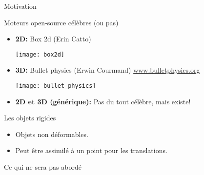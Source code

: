 \begin{frame}{Motivation}
    \begin{figure}[h]
        \setcounter{subfigure}{0}
    \end{figure}
\end{frame}

\begin{frame}{Moteurs open-source célèbres (ou pas)}
    \begin{itemize}
        \item \textbf{2D:} Box 2d (Erin Catto)
            \begin{center}
                \texttt{[image: box2d]}
            \end{center}
        \item \textbf{3D:} Bullet physics (Erwin Courmand)
            \href{http://www.bulletphysics.org/Bullet/phpBB3/}{www.bulletphysics.org}
            \begin{center}
                \texttt{[image: bullet\_physics]}
            \end{center}
            \pause
        \item \textbf{2D et 3D (générique):} Pas du tout célèbre, mais existe!
    \end{itemize}
\end{frame}

\begin{frame}{Les objets rigides}
    \begin{itemize}
        \item Objets non déformables.
        \item Peut être assimilé à un point pour les translations.
    \end{itemize}
    \begin{figure}[h]
        \setcounter{subfigure}{0}
    \end{figure}
\end{frame}

\begin{frame}{Ce qui ne sera pas abordé}
    \begin{figure}[h]
        \setcounter{subfigure}{0}
        \pause
        \pause
    \end{figure}
\end{frame}
